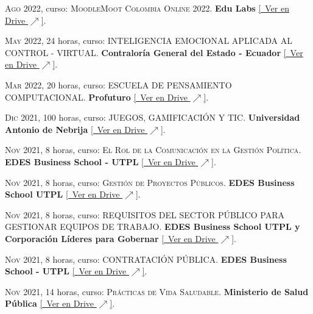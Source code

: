 \documentclass[a4paper]{article}
\begin{document}
\textsc{Ago} 2022, curso: \textsc{MoodleMoot Colombia Online 2022}.
\textbf{Edu Labs} \small \href{https://drive.google.com/file/d/15WeXxc1Q5Yx7mF5AKxiq9O6c4sdWXEcl/view}{[\faGoogleDrive~Ver en Drive $\nearrow$]}.

\textsc{May} 2022, 24 horas, curso: \textsc{INTELIGENCIA EMOCIONAL APLICADA AL CONTROL - VIRTUAL}.
\textbf{Contraloría General del Estado - Ecuador} \small \href{https://drive.google.com/file/d/1z3YcgMBSZisV-ruzkjEfUOzRC6XmodYa/view}{[\faGoogleDrive~Ver en Drive $\nearrow$]}.

\textsc{Mar} 2022, 20 horas, curso: \textsc{ESCUELA DE PENSAMIENTO COMPUTACIONAL}.
\textbf{Profuturo} \small \href{https://drive.google.com/file/d/1BzgjEdlt0J77BL2sTsGvQ2mmRjVaJq1l/view}{[\faGoogleDrive~Ver en Drive $\nearrow$]}.

\textsc{Dic} 2021, 100 horas, curso: \textsc{JUEGOS, GAMIFICACIÓN Y TIC}.
\textbf{Universidad Antonio de Nebrija} \small \href{https://drive.google.com/file/d/1_P8DHh2HPl9yvCicGIIM4zd3VIJytI8e/view}{[\faGoogleDrive~Ver en Drive $\nearrow$]}.

\textsc{Nov} 2021, 8 horas, curso: \textsc{El Rol de la Comunicación en la Gestión Política}.
\textbf{EDES Business School - UTPL} \small \href{https://drive.google.com/file/d/1zQV7-UpgpsTDFgYWHw2VV7wuL8CH1DUm/view}{[\faGoogleDrive~Ver en Drive $\nearrow$]}.

\textsc{Nov} 2021, 8 horas, curso: \textsc{Gestión de Proyectos Públicos}.
\textbf{EDES Business School UTPL} \small \href{https://drive.google.com/file/d/1v_MVBxsio56ofTFxtcteIuPaiBgfnGR_/view}{[\faGoogleDrive~Ver en Drive $\nearrow$]}.

\textsc{Nov} 2021, 8 horas, curso: \textsc{REQUISITOS DEL SECTOR PÚBLICO PARA GESTIONAR EQUIPOS DE TRABAJO}.
\textbf{EDES Business School UTPL y Corporación Líderes para Gobernar} \small \href{https://drive.google.com/file/d/1jrwaD1kRf3DWdfuTMjLztNgmZ8vwHYiW/view}{[\faGoogleDrive~Ver en Drive $\nearrow$]}.

\textsc{Nov} 2021, 8 horas, curso: \textsc{CONTRATACIÓN PÚBLICA}.
\textbf{EDES Business School - UTPL} \small \href{https://drive.google.com/file/d/1aQbZeirXp7LlAU9F2uBluTvKWtg_VLwX/view}{[\faGoogleDrive~Ver en Drive $\nearrow$]}.

\textsc{Nov} 2021, 14 horas, curso: \textsc{Prácticas de Vida Saludable}.
\textbf{Ministerio de Salud Pública} \small \href{https://drive.google.com/file/d/1R8tBBIvmlOAKZg6gALNLhM-BFGWdOSS9/view}{[\faGoogleDrive~Ver en Drive $\nearrow$]}.
\end{document}
